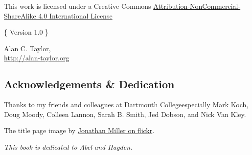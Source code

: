 

\vspace*{4cm}
\begin{center}


\ccbyncsa 

\vspace{1cm}

This work is licensed under a Creative Commons \href{https://creativecommons.org/licenses/by-nc-sa/4.0/}{Attribution-NonCommercial-ShareAlike 4.0 International License}

\vspace{3cm}



\noindent \{ Version 1.0 \}



\end{center}


\begin{center}


\vfill

Alan C. Taylor, \the\year \\


\href{http://www.alan-taylor.org}{http://alan-taylor.org}
\end{center}




\newpage

\begin{center}\section*{Acknowledgements \& Dedication}\end{center}

\bigskip

\noindent Thanks to my friends and colleagues at Dartmouth College\textemdash especially Mark Koch, Doug Moody, Colleen Lannon, Sarah B. Smith, Jed Dobson, and Nick Van Kley.

\vspace{1cm}

\begin{center}
\noindent The title page image by \href{https://www.flickr.com/photos/jonathanfmiller/7142111563/}{Jonathan Miller on flickr}.
\end{center}

\vspace{3cm}


\vfill

\begin{center}\emph{This book is dedicated to Abel and Hayden.}\end{center}

\newpage